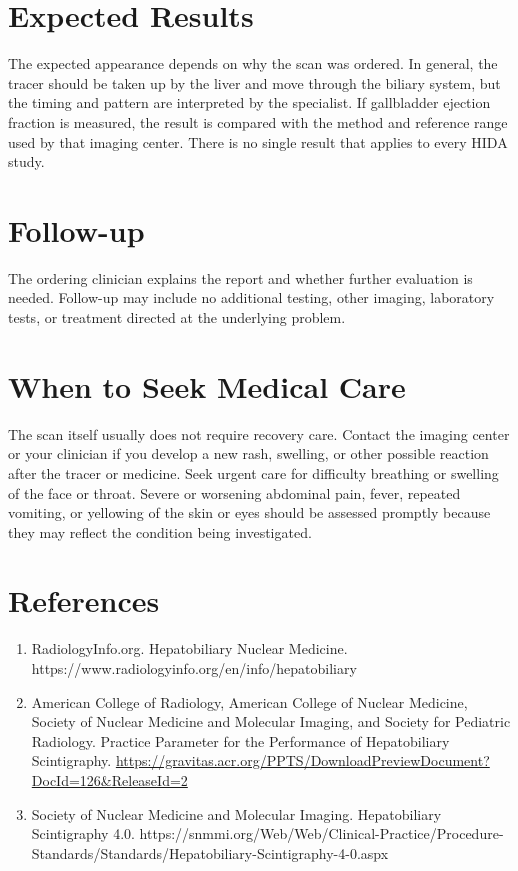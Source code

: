 \section*{Expected Results}
The expected appearance depends on why the scan was ordered. In general, the tracer should be taken up by the liver and move through the biliary system, but the timing and pattern are interpreted by the specialist. If gallbladder ejection fraction is measured, the result is compared with the method and reference range used by that imaging center. There is no single result that applies to every HIDA study.

\section*{Follow-up}
The ordering clinician explains the report and whether further evaluation is needed. Follow-up may include no additional testing, other imaging, laboratory tests, or treatment directed at the underlying problem.

\section*{When to Seek Medical Care}
The scan itself usually does not require recovery care. Contact the imaging center or your clinician if you develop a new rash, swelling, or other possible reaction after the tracer or medicine. Seek urgent care for difficulty breathing or swelling of the face or throat. Severe or worsening abdominal pain, fever, repeated vomiting, or yellowing of the skin or eyes should be assessed promptly because they may reflect the condition being investigated.

\section*{References}
\begin{enumerate}
  \item RadiologyInfo.org. Hepatobiliary Nuclear Medicine. https://www.radiologyinfo.org/en/info/hepatobiliary
  \item American College of Radiology, American College of Nuclear Medicine, Society of Nuclear Medicine and Molecular Imaging, and Society for Pediatric Radiology. Practice Parameter for the Performance of Hepatobiliary Scintigraphy. \url{https://gravitas.acr.org/PPTS/DownloadPreviewDocument?DocId=126&ReleaseId=2}
  \item Society of Nuclear Medicine and Molecular Imaging. Hepatobiliary Scintigraphy 4.0. https://snmmi.org/Web/Web/Clinical-Practice/Procedure-Standards/Standards/Hepatobiliary-Scintigraphy-4-0.aspx
\end{enumerate}

\clearpage
